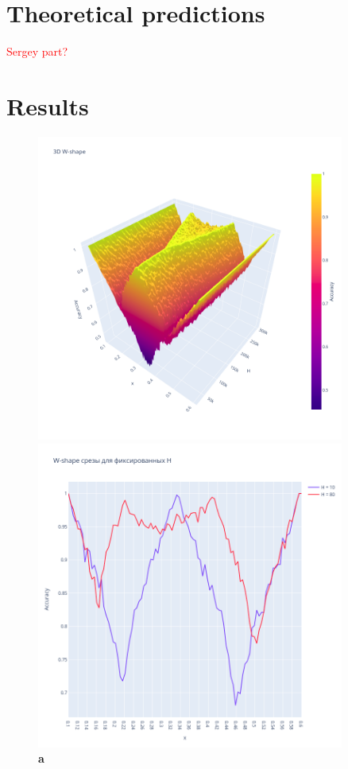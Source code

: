 \section{Theoretical predictions}\label{sec:theory}
\textcolor{red}{Sergey part?}

\section{Results}\label{sec:results}

\begin{figure}[h]
    \centering
    \begin{minipage}{0.45\textwidth}
        \centering
        \includegraphics[width=0.9\textwidth]{../fig/wide_3D.png} %
        \caption*{\textbf{a}}
        \label{fig:wide_3D}
    \end{minipage}\hfill
    \begin{minipage}{0.45\textwidth}
        \centering
        \includegraphics[width=0.9\textwidth]{../fig/wide_slices.png} %

\end{minipage}
\end{figure}
